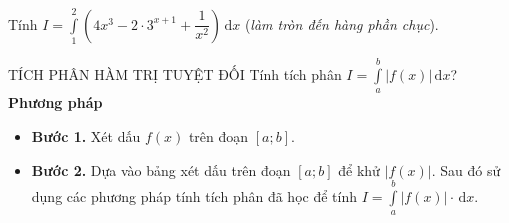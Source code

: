 \begin{ex}%
Tính $I=\displaystyle\int\limits_1^2\left(4x^3-2\cdot3^{x+1}+\dfrac{1}{x^2} \right) \mathrm{\,d}x$ (\textit{làm tròn đến hàng phần chục}).
\end{ex}



\begin{dang}{TÍCH PHÂN HÀM TRỊ TUYỆT ĐỐI}
Tính tích phân $I=\displaystyle\int\limits_a^b|f(x)| \mathrm{\,d}x$?\\
\textbf{Phương pháp}
\begin{itemize}
	\item \textbf{Bước 1.} Xét dấu $f(x)$ trên đoạn $[a ; b]$.
	\item \textbf{Bước 2.} Dựa vào bảng xét dấu trên đoạn $[a ; b]$ để khử $|f(x)|$. Sau đó sử dụng các phương pháp tính tích phân đã học để tính $I=\displaystyle\int\limits_a^b|f(x)| \cdot \mathrm{\,d}x$.
\end{itemize}
\end{dang}

